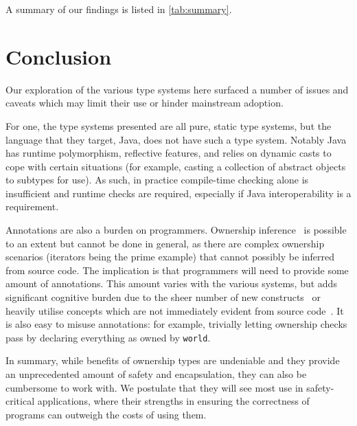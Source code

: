\documentclass{acm_proc_article-sp}
\begin{document}
A summary of our findings is listed in \cref{tab:summary}.

\section{Conclusion}
\label{sec:conclusion}

Our exploration of the various type systems here surfaced a number of issues and
caveats which may limit their use or hinder mainstream adoption.

For one, the type systems presented are all pure, static type systems, but the
language that they target, Java, does not have such a type system. Notably Java
has runtime polymorphism, reflective features, and relies on dynamic casts to
cope with certain situations (for example, casting a collection of abstract
objects to subtypes for use). As such, in practice compile-time checking alone
is insufficient \cite{boyapati04safejava} and runtime checks are required,
especially if Java interoperability is a requirement.

Annotations are also a burden on programmers. Ownership
inference~\cite{boyapati04safejava} is possible to an extent but cannot be done
in general, as there are complex ownership scenarios (iterators being the prime
example) that cannot possibly be inferred from source code. The implication is
that programmers will need to provide some amount of annotations. This amount
varies with the various systems, but adds significant cognitive burden due to
the sheer number of new constructs~\cite{boyapati04safejava} or heavily utilise
concepts which are not immediately evident from source
code~\cite{cameron07mojo}. It is also easy to misuse annotations: for example,
trivially letting ownership checks pass by declaring everything as owned by
\lstinline|world|.

In summary, while benefits of ownership types are undeniable and they provide
an unprecedented amount of safety and encapsulation, they can also be cumbersome
to work with. We postulate that they will see most use in safety-critical
applications, where their strengths in ensuring the correctness of programs can
outweigh the costs of using them.

\nocite{*}



\end{document}
